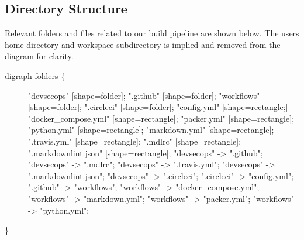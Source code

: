 \begin{Shaded}
\begin{Highlighting}[]
 \NormalTok{ ,}\NormalTok{ ,}\NormalTok{ ,}\NormalTok{ ,}\NormalTok{ ,}\NormalTok{ ,}\NormalTok{ ,}\NormalTok{ ,}\NormalTok{ ,}\NormalTok{ ,}\NormalTok{ ,}\NormalTok{ ,}\NormalTok{ ,}\NormalTok{ ,}\NormalTok{ ,}\NormalTok{ ,}\NormalTok{ ,}\NormalTok{ ,}\NormalTok{ ,}\NormalTok{ ,}\NormalTok{ ,}\NormalTok{ ,}\NormalTok{ ,}\NormalTok{ ,}\NormalTok{ ,}\NormalTok{ ,}\NormalTok{ ,}\NormalTok{ ,}\NormalTok{ ,}\NormalTok{ ,}\NormalTok{ ,} 
\end{Highlighting}
\end{Shaded}

\clearpage

\hypertarget{directory-structure}{%
\subsection{Directory Structure}\label{directory-structure}}

Relevant folders and files related to our build pipeline are shown
below. The users home directory and workspace subdirectory is implied
and removed from the diagram for clarity.

\begin{description}
\item[digraph folders \{]
"devsecops" {[}shape=folder{]}; ".github" {[}shape=folder{]};
"workflows" {[}shape=folder{]}; ".circleci" {[}shape=folder{]};
"config.yml" {[}shape=rectangle;{]} "docker\_compose.yml"
{[}shape=rectangle{]}; "packer.yml" {[}shape=rectangle{]}; "python.yml"
{[}shape=rectangle{]}; "markdown.yml" {[}shape=rectangle{]};
".travis.yml" {[}shape=rectangle{]}; ".mdlrc" {[}shape=rectangle{]};
".markdownlint.json" {[}shape=rectangle{]}; "devsecops" -\textgreater{}
".github"; "devsecops" -\textgreater{} ".mdlrc"; "devsecops"
-\textgreater{} ".travis.yml"; "devsecops" -\textgreater{}
".markdownlint.json"; "devsecops" -\textgreater{} ".circleci";
".circleci" -\textgreater{} "config.yml"; ".github" -\textgreater{}
"workflows"; "workflows" -\textgreater{} "docker\_compose.yml";
"workflows" -\textgreater{} "markdown.yml"; "workflows" -\textgreater{}
"packer.yml"; "workflows" -\textgreater{} "python.yml";
\end{description}

\}
